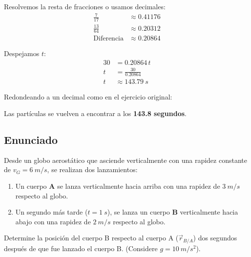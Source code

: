 \documentclass[12pt, a4paper]{article}
\begin{document}
Resolvemos la resta de fracciones o usamos decimales:
\begin{align*}
    \frac{7}{17} &\approx 0.41176 \\
    \frac{13}{64} &\approx 0.20312 \\
    \text{Diferencia} &\approx 0.20864
\end{align*}

Despejamos $t$:
\begin{align*}
    30 &= 0.20864 \, t \\
    t &= \frac{30}{0.20864} \\
    t &\approx \SI{143.79}{s}
\end{align*}

Redondeando a un decimal como en el ejercicio original:

\begin{tcolorbox}[colback=blue!5!white, colframe=blue!75!black, title=Respuesta Final]
    Las partículas se vuelven a encontrar a los \textbf{143.8 segundos}.
\end{tcolorbox}

\newpage

\subsection*{Enunciado}
Desde un globo aerostático que asciende verticalmente con una rapidez constante de $v_G = \SI{6}{m/s}$, se realizan dos lanzamientos:
\begin{enumerate}
    \item Un cuerpo \textbf{A} se lanza verticalmente hacia arriba con una rapidez de $\SI{3}{m/s}$ respecto al globo.
    \item Un segundo más tarde ($t = \SI{1}{s}$), se lanza un cuerpo \textbf{B} verticalmente hacia abajo con una rapidez de $\SI{2}{m/s}$ respecto al globo.
\end{enumerate}
Determine la posición del cuerpo B respecto al cuerpo A ($\vec{r}_{B/A}$) dos segundos después de que fue lanzado el cuerpo B. (Considere $g = \SI{10}{m/s^2}$).
\end{document}
